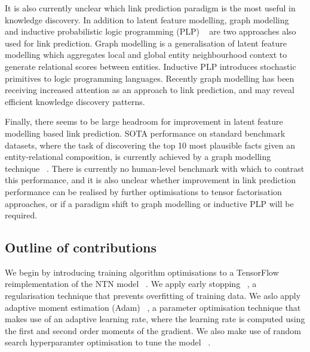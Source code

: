 \noindent It is also currently unclear which link prediction paradigm is the most useful in knowledge discovery. In addition to latent feature modelling, graph modelling \unskip~\citep{niepert2016discriminative, schlichtkrull2018modeling, pinter2018predicting} and inductive probabilistic logic programming (PLP) \unskip~\citep{speichert2018learning} are two approaches also used for link prediction. Graph modelling is a generalisation of latent feature modelling which aggregates local and global entity neighbourhood context to generate relational scores between entities. Inductive PLP introduces stochastic primitives to logic programming languages. Recently graph modelling has been receiving increased attention as an approach to link prediction, and may reveal efficient knowledge discovery patterns. \par

\noindent Finally, there seems to be large headroom for improvement in latent feature modelling based link prediction. SOTA performance on standard benchmark datasets, where the task of discovering the top 10 most plausible facts given an entity-relational composition, is currently achieved by a graph modelling technique \unskip~\citep{ruderNLPProg}. There is currently no human-level benchmark with which to contrast this performance, and it is also unclear whether improvement in link prediction performance can be realised by further optimisations to tensor factorisation approaches, or if a paradigm shift to graph modelling or inductive PLP will be required.  

\subsection{Outline of contributions}

We begin by introducing training algorithm optimisations to a TensorFlow \unskip~\citep{abadi2016tensorflow} reimplementation of the NTN model \unskip~\citep{Doss2015}.  We apply early stopping \unskip~\citep{prechelt1998early}, a regularisation technique that prevents overfitting of training data. We aslo apply adaptive moment estimation (Adam)  \unskip~\citep{kingma2014adam}, a parameter optimisation technique that makes use of an adaptive learning rate, where the learning rate is computed using the first and second order moments of the gradient. We also make use of random search hyperparamter optimisation to tune the model \unskip~\citep{bergstra2012random}. \par

